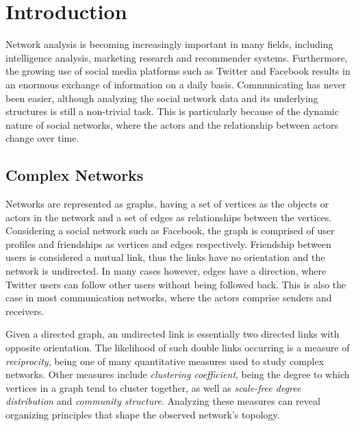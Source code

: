 \chapter{Introduction}\label{ch:Introduction}
    
Network analysis is becoming increasingly important in many fields, including intelligence analysis, marketing research and recommender systems. Furthermore, the growing use of social media platforms such as Twitter and Facebook results in an enormous exchange of information on a daily basis. Communicating has never been easier, although analyzing the social network data and its underlying structures is still a non-trivial task. This is particularly because of the dynamic nature of social networks, where the actors and the relationship between actors change over time.


\section{Complex Networks}

    Networks are represented as graphs, having a set of vertices as the objects or actors in the network and a set of edges as relationships between the vertices. Considering a social network such as Facebook, the graph is comprised of user profiles and friendships as vertices and edges respectively. Friendship between users is considered a mutual link, thus the links have no orientation and the network is undirected. In many cases however, edges have a direction, where Twitter users can follow other users without being followed back. This is also the case in most communication networks, where the actors comprise senders and receivers. 
    
    Given a directed graph, an undirected link is essentially two directed links with opposite orientation. The likelihood of such double links occurring is a measure of \emph{reciprocity}, being one of many quantitative measures used to study complex networks. Other measures include \emph{clustering coefficient}, being the degree to which vertices in a graph tend to cluster together, as well as \emph{scale-free degree distribution} and \emph{community structure}. Analyzing these measures can reveal organizing principles that shape the observed network's topology.
    
